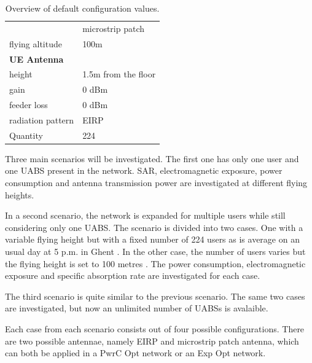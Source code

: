 \documentclass[twocolumn]{phdsymp} %
\begin{document}
\begin{table}[!htb]
\begin{tabular}[t]{ll}
         \hspace{3mm}                           & microstrip patch\\
        \hspace{3mm}  flying altitude           & 100m  \\
        \hline
        \multicolumn{2}{l}{\textbf{UE Antenna}} \\
        \hline 
        \hspace{3mm} height                     & 1.5m from the floor       \\ 
        \hspace{3mm} gain                      & 0 dBm   \\ 
        \hspace{3mm} feeder loss               & 0 dBm   \\ 
        \hspace{3mm} radiation pattern         & EIRP  \\
        \hspace{3mm} Quantity                  & 224 \\
        \toprule
\end{tabular}
\caption{Overview of default configuration values.}
\label{table:defaultconf}
\end{table}

Three main scenarios will be investigated. 
The first one has only one user and one \gls{UABS} present in the network. 
SAR, electromagnetic exposure, power consumption 
and antenna transmission power are investigated at different flying heights.

In a second scenario, the network is expanded for multiple users while still considering only one \gls{UABS}. 
The scenario is divided into two cases. One with a variable flying height but with a fixed 
number of 224 users as is average on an usual day at 5 p.m. in Ghent \cite{J2}.
 In the other case, the number of users varies but the flying height is set to 100 metres \cite{J2}.
The power consumption, electromagnetic exposure and specific 
absorption rate are investigated for each case.

The third scenario is quite similar to the previous scenario. The same two cases are investigated, but now an unlimited number of \gls{UABS}s is avalaible.

Each case from each scenario consists out of four possible configurations.
There are two possible antennae, namely EIRP 
and microstrip patch antenna, which can both be applied in a \gls{PwrC Opt} network or an \gls{Exp Opt} network.
\end{document}
